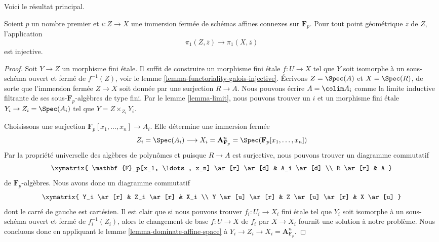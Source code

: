 \noindent
Voici le résultat principal.

\begin{proposition}
\label{proposition-injective}
Soient $p$ un nombre premier et $i : Z \to X$ une immersion fermée
de schémas affines connexes sur $\mathbf{F}_p$. Pour tout point géométrique
$\overline{z}$ de $Z$, l'application
$$
\pi_1(Z, \overline{z}) \to \pi_1(X, \overline{z})
$$
est injective.
\end{proposition}

\begin{proof}
Soit $Y \to Z$ un morphisme fini \'etale. Il suffit de construire
un morphisme fini \'etale $f : U \to X$ tel que $Y$ soit isomorphe à
un sous-schéma ouvert et fermé de $f^{-1}(Z)$, voir
le lemme \ref{lemma-functoriality-galois-injective}.
Écrivons $Z = \Spec(A)$ et $X = \Spec(R)$, de sorte que l'immersion fermée
$Z \to X$ soit donnée par une surjection $R \to A$. Nous pouvons écrire
$A = \colim A_i$ comme la limite inductive filtrante de ses sous-$\mathbf{F}_p$-algèbres
de type fini. Par le lemme \ref{lemma-limit},
nous pouvons trouver un $i$ et un morphisme fini \'etale $Y_i \to Z_i = \Spec(A_i)$
tel que $Y = Z \times_{Z_i} Y_i$.

\medskip\noindent
Choisissons une surjection $\mathbf{F}_p[x_1, \ldots, x_n] \to A_i$.
Elle détermine une immersion fermée
$$
Z_i = \Spec(A_i)
\longrightarrow
X_i = \mathbf{A}^n_{\mathbf{F}_p} = \Spec(\mathbf{F}_p[x_1, \ldots, x_n])
$$
Par la propriété universelle des algèbres de polynômes et puisque
$R \to A$ est surjective, nous pouvons trouver un diagramme commutatif
$$
\xymatrix{
\mathbf{F}_p[x_1, \ldots, x_n] \ar[r] \ar[d] &
A_i \ar[d] \\
R \ar[r] &
A
}
$$
de $\mathbf{F}_p$-algèbres. Nous avons donc un diagramme commutatif
$$
\xymatrix{
Y_i \ar[r] &
Z_i \ar[r] &
X_i \\
Y \ar[u] \ar[r] &
Z \ar[u] \ar[r] &
X \ar[u]
}
$$
dont le carré de gauche est cartésien. Il est clair que si nous pouvons
trouver $f_i : U_i \to X_i$ fini \'etale tel que $Y_i$ soit
isomorphe à un sous-schéma ouvert et fermé de $f_i^{-1}(Z_i)$,
alors le changement de base $f : U \to X$ de $f_i$ par $X \to X_i$
fournit une solution à notre problème. Nous concluons donc en appliquant
le lemme \ref{lemma-dominate-affine-space} à
$Y_i \to Z_i \to X_i = \mathbf{A}^n_{\mathbf{F}_p}$.
\end{proof}

















